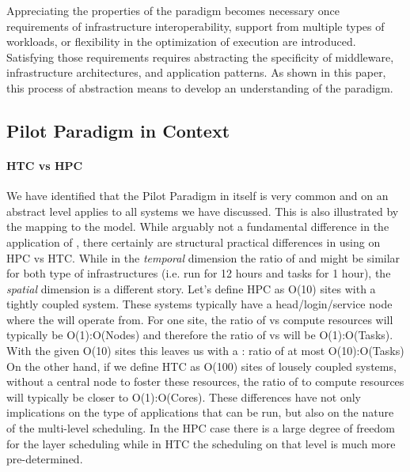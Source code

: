 \documentclass{sig-alternate}
\begin{document}
Appreciating the properties of the \pilot paradigm becomes necessary once
requirements of infrastructure interoperability, support from multiple types of
workloads, or flexibility in the optimization of execution are introduced.
Satisfying those requirements requires abstracting the specificity of
middleware, infrastructure architectures, and application patterns. As shown in
this paper, this process of abstraction means to develop an understanding of
the \pilot paradigm.


\subsection{Pilot Paradigm in Context}
\label{sec:context}

\paragraph*{HTC vs HPC} We have identified that the Pilot Paradigm in itself is
very common and on an abstract level applies to all \pilot systems we have
discussed. This is also illustrated by the mapping to the \pstar model.
While arguably not a fundamental difference in the application of \pilots,
there certainly are structural practical differences in using \pilots on HPC vs
HTC.
While in the \textit{temporal} dimension the ratio of  and \pilots might
be similar for both type of infrastructures (i.e. \pilots run for 12 hours and
tasks for 1 hour), the \textit{spatial} dimension is a different story.
Let's define HPC as O(10) sites with a tightly coupled system.
These systems typically have a head/login/service node where the \pilot will
operate from.
For one site, the ratio of \pilots vs compute resources will typically be
O(1):O(Nodes) and therefore the ratio of \pilots vs  will be
O(1):O(Tasks).
With the given O(10) sites this leaves us with a \pilot: ratio of at most
O(10):O(Tasks)
On the other hand, if we define HTC as O(100) sites of lousely coupled systems,
without a central node to foster these resources, the ratio of \pilots to
compute resources will typically be closer to O(1):O(Cores).
These differences have not only implications on the type of applications that
can be run, but also on the nature of the multi-level scheduling. In the HPC
case there is a large degree of freedom for the \pilot layer scheduling while
in HTC the scheduling on that level is much more pre-determined.
\end{document}
